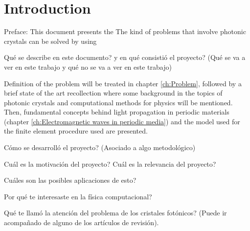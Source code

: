 \chapter{Introduction}

Preface:
This document presents the 
The kind of problems that involve photonic crystals can be solved by using 


Qu\'e se describe en este documento? y en qu\'e consisti\'o el proyecto? (Qu\'e se va a ver en este trabajo y qu\'e no se va a ver en este trabajo)


Definition of the problem will be treated in chapter \ref{ch:Problem}, followed by a brief state of the art recollection where some background in the topics of photonic crystals and computational methods for physics will be mentioned. Then, fundamental concepts behind light propagation in periodic materials (chapter \ref{ch:Electromagnetic waves in periodic media})  and the model used for the finite element procedure used are presented.

C\'omo se desarroll\'o el proyecto? (Asociado a algo metodol\'ogico)

Cu\'al es la motivaci\'on del proyecto? Cu\'al es la relevancia del proyecto?

Cu\'ales son las posibles aplicaciones de esto?

Por qu\'e te interesaste en la f\'isica computacional?

Qu\'e te llam\'o la atenci\'on del problema de los cristales fot\'onicos? (Puede ir acompa\~nado de alguno de los art\'iculos de revisi\'on).


